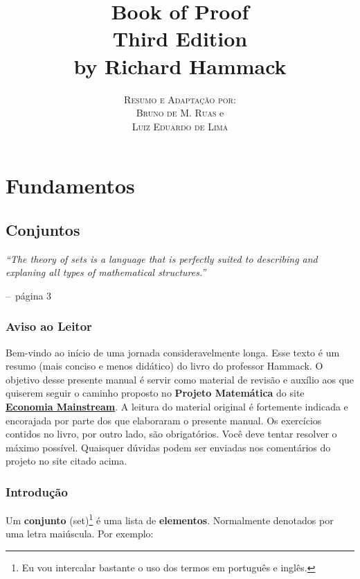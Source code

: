 \documentclass[a4paper,11pt,oneside]{book}
\title{\Huge \textbf{Book of Proof} \\ 
\Large Third Edition \\
\huge by Richard Hammack}
\author{
\textsc{Resumo e Adaptação por:} \\
\textsc{Bruno de M. Ruas} e \\ 
\textsc{Luiz Eduardo de Lima} 
}
\makeatletter
\theoremstyle{definition}
\theoremstyle{break}
\newenvironment{chapquote}[2][2em]
  {\setlength{\@tempdima}{#1}%
   \def\chapquote@author{#2}%
   \parshape 1 \@tempdima \dimexpr\textwidth-2\@tempdima\relax%
   \itshape}
  {\par\normalfont\hfill--\ \chapquote@author\hspace*{\@tempdima}\par\bigskip}
\makeatother
\begin{document}
\frontmatter
\maketitle

\tableofcontents

\mainmatter

\part{Fundamentos}

\chapter{Conjuntos}

\begin{chapquote}{página 3}
	``The theory of sets is a language that is perfectly suited to describing and explaning all types of mathematical structures.''
\end{chapquote}

\section*{Aviso ao Leitor}
Bem-vindo ao início de uma jornada consideravelmente longa. Esse texto é um resumo (mais conciso e menos didático) do livro do professor Hammack. O objetivo desse presente manual é servir como material de revisão e auxílio aos que quiserem seguir o caminho proposto no \textbf{Projeto Matemática} do site \href{https://economiamainstream.com.br/artigo/matematica/}{\textbf{Economia Mainstream}}. A leitura do material original é fortemente indicada e encorajada por parte dos que elaboraram o presente manual. Os exercícios contidos no livro, por outro lado, são obrigatórios. Você deve tentar resolver o máximo possível. Quaisquer dúvidas podem ser enviadas nos comentários do projeto no site citado acima.


\section{Introdução}
Um \textbf{conjunto} (set)\footnote{Eu vou intercalar bastante o uso dos termos em português e inglês.} é uma lista de \textbf{elementos}. Normalmente denotados por uma letra maiúscula. Por exemplo:
\end{document}
